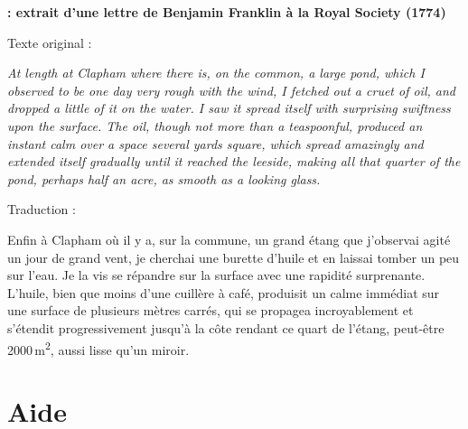 \documentclass[12pt,a4paper]{article}
\begin{document}
\begin{doc}
\textbf{: extrait d'une lettre de Benjamin Franklin à la Royal Society (1774)}
\begin{multicols}{2}
\noindent
Texte original :

\textit{ \og
At length at Clapham where there is, on the common, a large pond, which I observed to be one day very rough with the wind, I fetched out a cruet of oil, and dropped a little of it on the water.
I saw it spread itself with surprising swiftness upon the surface.
The oil, though not more than a teaspoonful, produced an instant calm over a space several yards square, which spread amazingly and extended itself gradually until it reached the leeside, making all that quarter of the pond, perhaps half an acre, as smooth as a looking glass.
\fg{} }

\noindent
Traduction :

Enfin à Clapham où il y a, sur la commune, un grand étang que j'observai agité un jour de grand vent, je cherchai une burette d'huile et en laissai tomber un peu sur l'eau.
Je la vis se répandre sur la surface avec une rapidité surprenante.
L'huile, bien que moins d'une cuillère à café, produisit un calme immédiat sur une surface de plusieurs mètres carrés, qui se propagea incroyablement et s'étendit progressivement jusqu'à la côte rendant ce quart de l'étang, peut-être 2000\,m\textsuperscript{2}, aussi lisse qu'un miroir.
\end{multicols}
\end{doc}

\section*{Aide}
\end{document}
